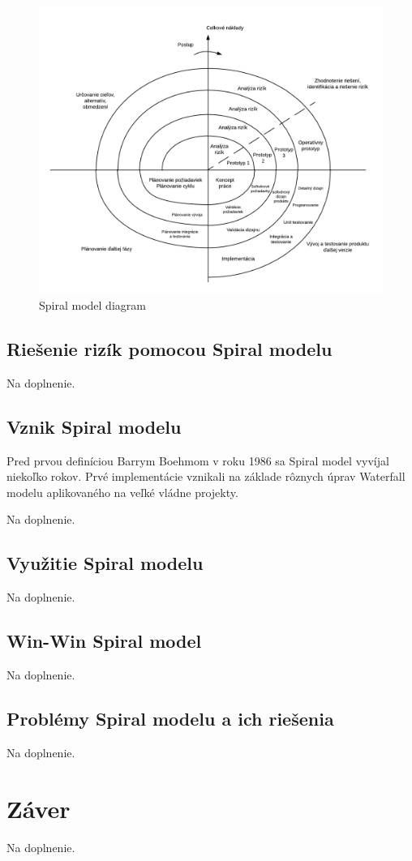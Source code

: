 \documentclass[10pt,twoside,slovak,a4paper]{article}
\begin{document}
\begin{figure}[h]
\includegraphics[width=\textwidth]{spiralModel.png}
\caption{Spiral model diagram \cite{Boehm}} 
\label{spiralDiagram}
\end{figure} 

\subsection{Riešenie rizík pomocou Spiral modelu} \label{risks:spiralModel}

Na doplnenie.

\subsection{Vznik Spiral modelu} \label{history:spiralModel}
Pred prvou definíciou Barrym Boehmom v roku 1986 sa Spiral model vyvíjal niekoľko rokov. Prvé implementácie vznikali na základe rôznych úprav Waterfall modelu aplikovaného na veľké vládne projekty. \cite{Boehm}

Na doplnenie.

\subsection{Využitie Spiral modelu} \label{usage:spiralModel}

Na doplnenie.

\subsection{Win-Win Spiral model} \label{winwin:spiralModel}

Na doplnenie.

\subsection{Problémy Spiral modelu a ich riešenia} \label{problems:spiralModel}

Na doplnenie.



\section{Záver} \label{zaver} 
Na doplnenie.





\end{document}
